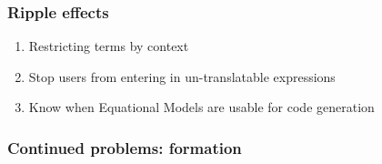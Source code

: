 \documentclass[xcolor={dvipsnames}]{beamer}
\begin{document}
\begin{frame}
  \frametitle{Ripple effects}

  \begin{enumerate}
    \item Restricting terms by context
    \item Stop users from entering in un-translatable expressions
    \item Know when Equational Models are usable for code generation
  \end{enumerate}

\end{frame}

\begin{frame}
  \frametitle{Continued problems: formation}

\end{frame}
\end{document}
